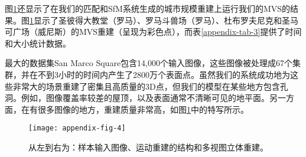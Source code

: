 \begin{translation}
图\ref{appendix-fig-4}还显示了在我们的匹配和SfM系统生成的城市规模重建上运行我们的MVS\cite{furukawa2010towards}的结果。图\ref{appendix-fig-4}显示了圣彼得大教堂（罗马）、罗马斗兽场（罗马）、杜布罗夫尼克和圣马可广场（威尼斯）的MVS重建（呈现为彩色点），而表\ref{appendix-tab-3}提供了时间和大小统计数据。
\begin{table}
	\centering
	\caption{四个视图簇的 MVS 重建统计数据}
	\label{appendix-tab-3}
\end{table}

最大的数据集San Marco Square包含14,000个输入图像，这些图像被处理成67个集群，并在不到3小时的时间内产生了2800万个表面点。虽然我们的系统成功地为这些非常大的场景重建了密集且高质量的3D点，但我们的模型在某些地方包含孔洞。例如，图像覆盖率较差的屋顶，以及表面通常不清晰可见的地平面。另一方面，在有很多图像的地方，重建质量非常高，如图\ref{appendix-fig-4}中的特写所示。

\begin{figure}
	\centering
	\texttt{[image: appendix-fig-4]}
	\caption[]{从左到右为：样本输入图像、运动重建的结构和多视图立体重建。}
	\label{appendix-fig-4}
\end{figure}


\end{translation}
